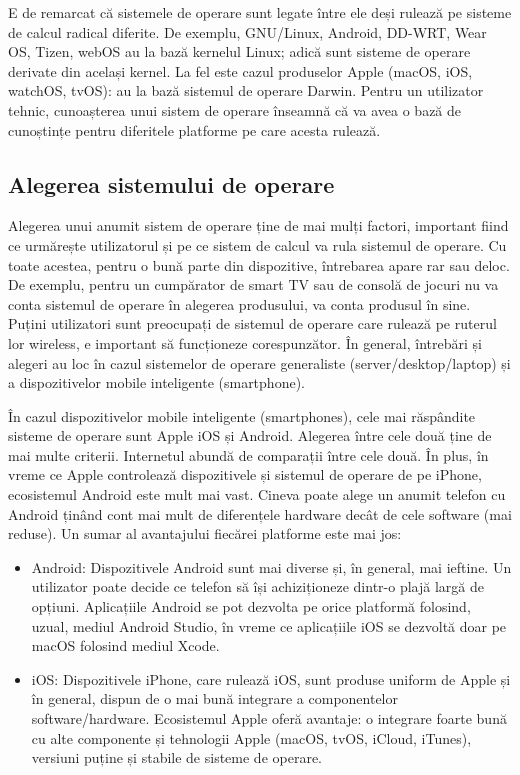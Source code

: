 E de remarcat că sistemele de operare sunt legate între ele deși rulează pe sisteme de calcul radical diferite. De exemplu, GNU/Linux, Android, DD-WRT, Wear OS, Tizen, webOS au la bază kernelul Linux; adică sunt sisteme de operare derivate din același kernel. La fel este cazul produselor Apple (macOS, iOS, watchOS, tvOS): au la bază sistemul de operare Darwin. Pentru un utilizator tehnic, cunoașterea unui sistem de operare înseamnă că va avea o bază de cunoștințe pentru diferitele platforme pe care acesta rulează.

\subsection{Alegerea sistemului de operare}
\label{sec:intro:pick}

Alegerea unui anumit sistem de operare ține de mai mulți factori, important fiind ce urmărește utilizatorul și pe ce sistem de calcul va rula sistemul de operare. Cu toate acestea, pentru o bună parte din dispozitive, întrebarea apare rar sau deloc. De exemplu, pentru un cumpărator de smart TV sau de consolă de jocuri nu va conta sistemul de operare în alegerea produsului, va conta produsul în sine. Puțini utilizatori sunt preocupați de sistemul de operare care rulează pe ruterul lor wireless, e important să funcționeze corespunzător. În general, întrebări și alegeri au loc în cazul sistemelor de operare generaliste (server/desktop/laptop) și a dispozitivelor mobile inteligente (smartphone).

În cazul dispozitivelor mobile inteligente (smartphones), cele mai răspândite sisteme de operare sunt Apple iOS și Android. Alegerea între cele două ține de mai multe criterii. Internetul abundă de comparații între cele două. În plus, în vreme ce Apple controlează dispozitivele și sistemul de operare de pe iPhone, ecosistemul Android este mult mai vast. Cineva poate alege un anumit telefon cu Android ținând cont mai mult de diferențele hardware decât de cele software (mai reduse). Un sumar al avantajului fiecărei platforme este mai jos:

\begin{itemize}
  \item Android: Dispozitivele Android sunt mai diverse și, în general, mai ieftine. Un utilizator poate decide ce telefon să își achiziționeze dintr-o plajă largă de opțiuni. Aplicațiile Android se pot dezvolta pe orice platformă folosind, uzual, mediul Android Studio, în vreme ce aplicațiile iOS se dezvoltă doar pe macOS folosind mediul Xcode.
  \item iOS: Dispozitivele iPhone, care rulează iOS, sunt produse uniform de Apple și în general, dispun de o mai bună integrare a componentelor software/hardware. Ecosistemul Apple oferă avantaje: o integrare foarte bună cu alte componente și tehnologii Apple (macOS, tvOS, iCloud, iTunes), versiuni puține și stabile de sisteme de operare.
\end{itemize}

